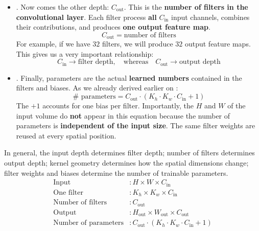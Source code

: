 \begin{itemize}
    
    \item {}. Now comes the other depth: $C_{\text{out}}$. This is the \textbf{number of filters in the convolutional layer}. Each filter process \textbf{all} $C_{\text{in}}$ input channels, combines their contributions, and produces \textbf{one output feature map}.
    \begin{equation*}
        C_{\text{out}} = \text{number of filters}
    \end{equation*}
    For example, if we have $32$ filters, we will produce $32$ output feature maps. This gives us a very important relationship:
    \begin{equation*}
        C_{\text{in}} \to \text{filter depth}, \quad
        \text{whereas} \quad
        C_{\text{out}} \to \text{output depth}
    \end{equation*}
    

    \item {}. Finally, parameters are the actual \textbf{learned numbers} contained in the filters and biases. As we already derived earlier on :
    \begin{equation*}
        \# \text{ parameters} = C_{\text{out}} \cdot (K_h \cdot K_w \cdot C_{\text{in}} + 1)
    \end{equation*}
    The $+1$ accounts for one bias per filter. Importantly, the $H$ and $W$ of the input volume do \textbf{not} appear in this equation because the number of parameters is \textbf{independent of the input size}. The same filter weights are reused at every spatial position.
\end{itemize}
In general, the input depth determines filter depth; number of filters determines output depth; kernel geometry determines how the spatial dimensions change; filter weights and biases determine the number of trainable parameters.
\begin{align*}
    \text{Input} &: H \times W \times C_{\text{in}} \\
    \text{One filter} &: K_h \times K_w \times C_{\text{in}} \\
    \text{Number of filters} &: C_{\text{out}} \\
    \text{Output} &: H_{\text{out}} \times W_{\text{out}} \times C_{\text{out}} \\
    \text{Number of parameters} &: C_{\text{out}} \cdot (K_h \cdot K_w \cdot C_{\text{in}} + 1)
\end{align*}